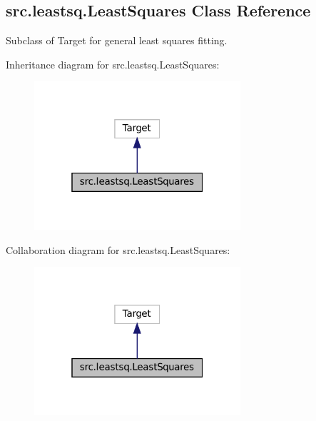 \hypertarget{classsrc_1_1leastsq_1_1LeastSquares}{}\subsection{src.\+leastsq.\+Least\+Squares Class Reference}
\label{classsrc_1_1leastsq_1_1LeastSquares}


Subclass of Target for general least squares fitting.  




Inheritance diagram for src.\+leastsq.\+Least\+Squares\+:
\nopagebreak
\begin{figure}[H]
\begin{center}
\leavevmode
\includegraphics[width=217pt]{classsrc_1_1leastsq_1_1LeastSquares__inherit__graph}
\end{center}
\end{figure}


Collaboration diagram for src.\+leastsq.\+Least\+Squares\+:
\nopagebreak
\begin{figure}[H]
\begin{center}
\leavevmode
\includegraphics[width=217pt]{classsrc_1_1leastsq_1_1LeastSquares__coll__graph}
\end{center}
\end{figure}
